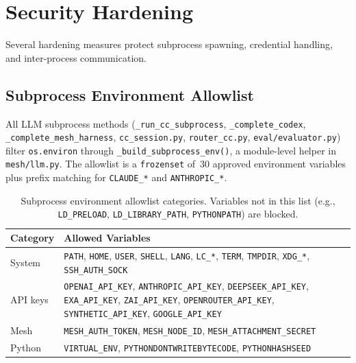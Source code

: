 \documentclass[11pt,a4paper]{article}
\newcommand{\code}[1]{\texttt{#1}}
\begin{document}
\section{Security Hardening}
\label{sec:security}

Several hardening measures protect subprocess spawning, credential
handling, and inter-process communication.

\subsection{Subprocess Environment Allowlist}

All LLM subprocess methods (\code{\_run\_cc\_subprocess},
\code{\_complete\_codex}, \code{\_complete\_mesh\_harness},
\code{cc\_session.py}, \code{router\_cc.py}, \code{eval/evaluator.py})
filter \code{os.environ} through \code{\_build\_subprocess\_env()}, a
module-level helper in \code{mesh/llm.py}. The allowlist is a
\code{frozenset} of~30 approved environment variables plus prefix
matching for \code{CLAUDE\_*} and \code{ANTHROPIC\_*}.

\begin{table}[h]
\centering
\small
\begin{tabular}{@{}lL{8cm}@{}}
\toprule
\textbf{Category} & \textbf{Allowed Variables} \\
\midrule
System     & \code{PATH}, \code{HOME}, \code{USER}, \code{SHELL},
             \code{LANG}, \code{LC\_*}, \code{TERM}, \code{TMPDIR},
             \code{XDG\_*}, \code{SSH\_AUTH\_SOCK} \\
API keys   & \code{OPENAI\_API\_KEY}, \code{ANTHROPIC\_API\_KEY},
             \code{DEEPSEEK\_API\_KEY}, \code{EXA\_API\_KEY},
             \code{ZAI\_API\_KEY}, \code{OPENROUTER\_API\_KEY},
             \code{SYNTHETIC\_API\_KEY}, \code{GOOGLE\_API\_KEY} \\
Mesh       & \code{MESH\_AUTH\_TOKEN}, \code{MESH\_NODE\_ID},
             \code{MESH\_ATTACHMENT\_SECRET} \\
Python     & \code{VIRTUAL\_ENV}, \code{PYTHONDONTWRITEBYTECODE},
             \code{PYTHONHASHSEED} \\
\bottomrule
\end{tabular}
\caption{Subprocess environment allowlist categories. Variables not in this
list (e.g., \code{LD\_PRELOAD}, \code{LD\_LIBRARY\_PATH},
\code{PYTHONPATH}) are blocked.}
\label{tab:env-allowlist}
\end{table}
\end{document}
